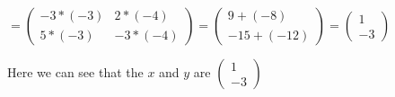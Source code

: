 \documentclass[options]{article}
\begin{document}
\begin{enumerate}
\begin{center}
        \(
            =
            \begin{pmatrix}
                -3 * (-3) & 2 * (-4)\\
                5 * (-3) & -3 * (-4)
            \end{pmatrix}
            =
            \begin{pmatrix}
                9 + (-8)\\
                -15 + (-12)
            \end{pmatrix}
            =
            \begin{pmatrix}
                1 \\ -3
            \end{pmatrix}
        \)
    \end{center}

    Here we can see that the \(x\) and \(y\) are \(\begin{pmatrix}1 \\ -3\end{pmatrix}\)
\end{enumerate}
\end{document}
